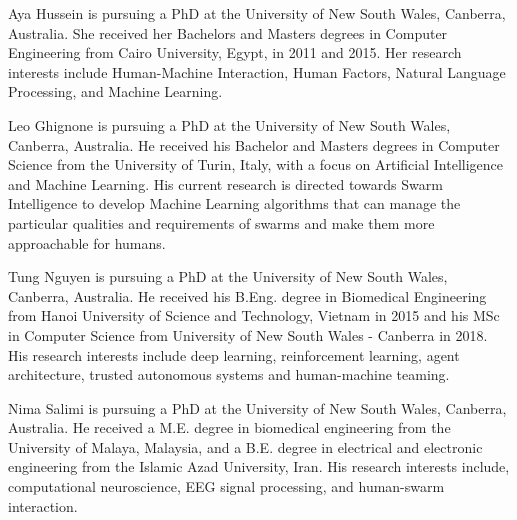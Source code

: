 \documentclass[journal]{IEEEtran}
\begin{document}



\begin{IEEEbiography}{Aya Hussein} is pursuing a PhD at the University of New South Wales, Canberra, Australia. She received her Bachelors and Masters degrees in Computer Engineering from Cairo University, Egypt, in 2011 and 2015. Her research interests include Human-Machine Interaction, Human Factors, Natural Language Processing, and Machine Learning.
\end{IEEEbiography}

\begin{IEEEbiography}{Leo Ghignone} is pursuing a PhD at the University of New South Wales, Canberra, Australia. He received his Bachelor and Masters degrees in Computer Science from the University of Turin, Italy, with a focus on Artificial Intelligence and Machine Learning. His current research is directed towards Swarm Intelligence to develop Machine Learning algorithms that can manage the particular qualities and requirements of swarms and make them more approachable for humans.
\end{IEEEbiography}

\begin{IEEEbiography}{Tung Nguyen} is pursuing a PhD at the University of New South Wales, Canberra, Australia. He received his B.Eng. degree in Biomedical Engineering from Hanoi University of Science and Technology, Vietnam in 2015 and his MSc in Computer Science from University of New South Wales - Canberra in 2018. His research interests include deep learning, reinforcement learning, agent architecture, trusted autonomous systems and human-machine teaming.
\end{IEEEbiography}

\begin{IEEEbiography}{Nima Salimi}  is pursuing a PhD at the University of New South Wales, Canberra, Australia. He received a M.E. degree in biomedical engineering from the University of Malaya, Malaysia, and a B.E. degree in electrical and electronic engineering from the Islamic Azad University, Iran. His research interests include, computational neuroscience, EEG signal processing, and human-swarm interaction.
\end{IEEEbiography}
\end{document}
